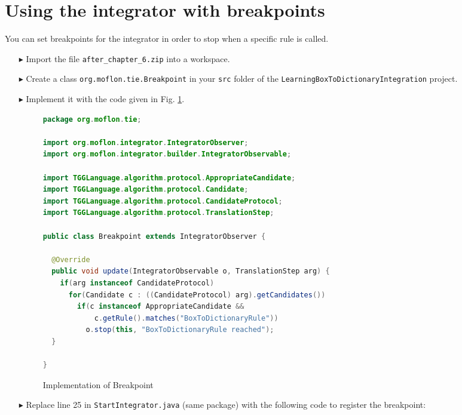 \section{Using the integrator with breakpoints}
\label{sec:app_integrator}
You can set breakpoints for the integrator in order to stop when a specific rule is called. 

\begin{enumerate}
	\item[$\blacktriangleright$] Import the file \texttt{after\_chapter\_6.zip} into a workspace.
	\item[$\blacktriangleright$] Create a class \texttt{org.moflon.tie.Breakpoint} in your \texttt{src} folder of the \texttt{LearningBoxToDictionaryIntegration} project.
	\item[$\blacktriangleright$] Implement it with the code given in Fig. \ref{fig:breakpoint_impl}.


\begin{figure}[htbp]
\begin{center}
\begin{lstlisting}[language=Java,backgroundcolor=\color{white}, keywordstyle={\bfseries\color{purple}}]
package org.moflon.tie;

import org.moflon.integrator.IntegratorObserver;
import org.moflon.integrator.builder.IntegratorObservable;

import TGGLanguage.algorithm.protocol.AppropriateCandidate;
import TGGLanguage.algorithm.protocol.Candidate;
import TGGLanguage.algorithm.protocol.CandidateProtocol;
import TGGLanguage.algorithm.protocol.TranslationStep;

public class Breakpoint extends IntegratorObserver {

  @Override
  public void update(IntegratorObservable o, TranslationStep arg) {
    if(arg instanceof CandidateProtocol)
      for(Candidate c : ((CandidateProtocol) arg).getCandidates())
        if(c instanceof AppropriateCandidate &&
            c.getRule().matches("BoxToDictionaryRule"))
          o.stop(this, "BoxToDictionaryRule reached");
  }

}

\end{lstlisting}
  \caption{Implementation of Breakpoint}
  \label{fig:breakpoint_impl}
\end{center}
\end{figure}
\FloatBarrier

	\item[$\blacktriangleright$] Replace line 25 in \texttt{StartIntegrator.java} (same package) with the following code to register the breakpoint:


\end{enumerate}
